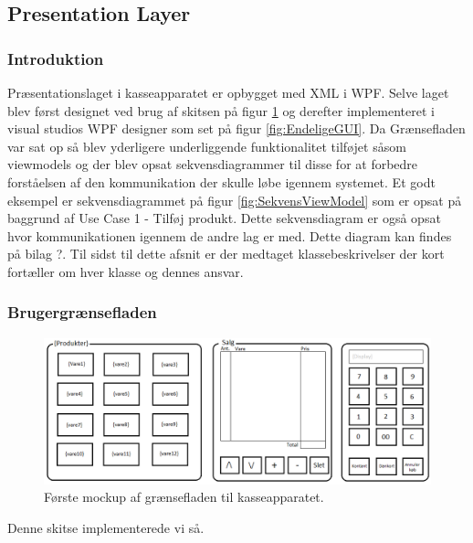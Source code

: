 
\subsection{Presentation Layer}

\subsubsection{Introduktion}
Præsentationslaget i kasseapparatet er opbygget med XML i WPF. Selve laget blev først designet ved brug af skitsen på figur \ref{fig:KasseMockup} og derefter implementeret i visual studios WPF designer som set på figur \ref{fig:EndeligeGUI}. Da Grænsefladen var sat op så blev yderligere underliggende funktionalitet tilføjet såsom viewmodels og der blev opsat sekvensdiagrammer til disse for at forbedre forståelsen af den kommunikation der skulle løbe igennem systemet. Et godt eksempel er sekvensdiagrammet på figur \ref{fig:SekvensViewModel} som er opsat på baggrund af Use Case 1 - Tilføj produkt. Dette sekvensdiagram er også opsat hvor kommunikationen igennem de andre lag er med. Dette diagram kan findes på bilag ?. Til sidst til dette afsnit er der medtaget klassebeskrivelser der kort fortæller om hver klasse og dennes ansvar. \\

\subsubsection{Brugergrænsefladen}

\begin{figure}[H]
	\centering
	\includegraphics[width=1\textwidth]{Systemdesign/Frontend/pics/KasseMockup}
	\caption{Første mockup af grænsefladen til kasseapparatet.}
	\label{fig:KasseMockup}
\end{figure}

Denne skitse implementerede vi så.

